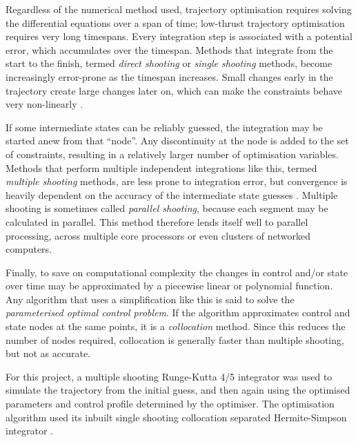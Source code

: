 
Regardless of the numerical method used, trajectory optimisation requires solving the differential equations over a span of time; low-thrust trajectory optimisation requires very long timespans. Every integration step is associated with a potential error, which accumulates over the timespan. Methods that integrate from the start to the finish, termed \emph{direct shooting} or \emph{single shooting} methods, become increasingly error-prone as the timespan increases. Small changes early in the trajectory create large changes later on, which can make the constraints behave very non-linearly \parencite{Betts1998}. 

If some intermediate states can be reliably guessed, the integration may be started anew from that \enquote{node}. Any discontinuity at the node is added to the set of constraints, resulting in a relatively larger number of optimisation variables. Methods that perform multiple independent integrations like this, termed \emph{multiple shooting} methods, are less prone to integration error, but convergence is heavily dependent on the accuracy of the intermediate state guesses \parencite{Betts1998, ASTOS_guide}. Multiple shooting is sometimes called \emph{parallel shooting}, because each segment may be calculated in parallel. This method therefore lends itself well to parallel processing, across multiple core processors or even clusters of networked computers. 

Finally, to save on computational complexity the changes in control and/or state over time may be approximated by a piecewise linear or polynomial function. Any algorithm that uses a simplification like this is said to solve the \emph{parameterised optimal control problem}. If the algorithm approximates control and state nodes at the same points, it is a \emph{collocation} method. Since this reduces the number of nodes required, collocation is generally faster than multiple shooting, but not as accurate.%

For this project, a multiple shooting Runge-Kutta 4/5 integrator was used to simulate the trajectory from the initial guess, and then again using the optimised parameters and control profile determined by the optimiser. The optimisation algorithm used its inbuilt single shooting collocation separated Hermite-Simpson integrator \parencite{Betts2010}.

